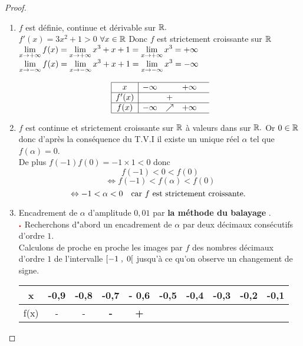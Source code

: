 \begin{proof}
 \begin{enumerate}
\item $ f $ est définie, continue et dérivable sur $ \mathbb{R}. $\\
$ f'(x) = 3x^{2}+1 > 0$  $\forall x\in \mathbb{R} $ Donc $ f $ est strictement croissante  sur $ \mathbb{R} $ \\
$ \displaystyle\lim_{x \to +\infty}f(x)=\displaystyle \lim_{x \to +\infty}x^{3}+x+1=\displaystyle\lim_{x \to +\infty}x^{3}=+\infty$\\
$\displaystyle \lim_{x \to -\infty}f(x)=\displaystyle \lim_{x \to -\infty}x^{3}+x+1=\displaystyle\lim_{x \to -\infty}x^{3}=-\infty$

$$
\begin{array}{|c|cccc}
\hline
x & -\infty & & +\infty & \\
\hline
f'(x) & & + & & \\
\hline
f(x) & -\infty & \nearrow & +\infty & \\
\hline
\end{array}
$$

\item $ f $ est continue et strictement croissante sur $ \mathbb{R}$ à valeurs dans sur $ \mathbb{R}. $ Or $ 0\in \mathbb{R} $ donc d'après la conséquence  du T.V.I il existe un unique réel $ \alpha $ tel que $ f(\alpha)=0 $.\\ De plus $ f(-1)f(0)=-1\times 1 < 0$ donc $$  f(-1)<0<f(0) $$ $$ \Leftrightarrow f(-1)<f(\alpha)<f(0) $$ $$ \Leftrightarrow -1<\alpha< 0 \quad \textrm{car $ f $ est strictement croissante. }$$
\item Encadrement de $ \alpha $ d'amplitude $ 0,01 $ par \textbf{la méthode du balayage }.\\
$ \color{red}\centerdot $ Recherchons d"abord un encadrement de $ \alpha $ par deux décimaux consécutifs d'ordre $ 1. $\\
Calculons de proche en proche les images par $ f $  des nombres décimaux d'ordre $ 1 $ de l'intervalle $ \left[-1 \;,\; 0\right[ $ jusqu'à ce qu'on observe un changement de signe.


\renewcommand{\arraystretch}{1}
\begin{tabular}{|*{10}{c|}}
\hline 
x &-0,9  &-0,8 & -0,7 &- 0,6 & -0,5 & -0,4 &-0,3 &-0,2& -0,1  \\
\hline
f(x) &-  & -  & \textbf{\color{red} -} & \textbf{\color{red} +}  & \color{green} &  &  &  &  \\
\hline
\end{tabular}


\end{enumerate}
\end{proof}
